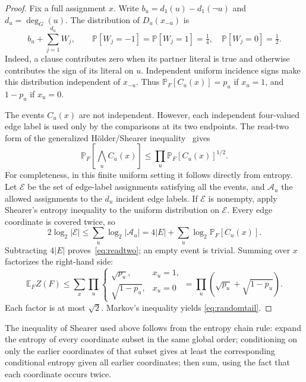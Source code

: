 \documentclass[11pt,a4paper]{article}
\theoremstyle{remark}
\newcommand{\E}{\mathbb E}
\newcommand{\Prb}{\mathbb P}
\begin{document}
\begin{proof}
Fix a full assignment $x$. Write $b_u=d_1(u)-d_1(\neg u)$ and
$d_u=\deg_G(u)$. The distribution of $D_u(x_{-u})$ is
\begin{equation}
 b_u+\sum_{j=1}^{d_u}W_j,\qquad
 \Prb[W_j=-1]=\Prb[W_j=1]=\tfrac14,\quad
 \Prb[W_j=0]=\tfrac12.                          \label{eq:lazy}
\end{equation}
Indeed, a clause contributes zero when its partner literal is true and
otherwise contributes the sign of its literal on $u$. Independent uniform
incidence signs make this distribution independent of $x_{-u}$.
Thus $\Prb_F[C_u(x)]=p_u$ if $x_u=1$, and $1-p_u$ if $x_u=0$.

The events $C_u(x)$ are not independent. However, each independent
four-valued edge label is used only by the comparisons at its two
endpoints. The read-two form of the generalized H\"older/Shearer
inequality~\cite{Finner,ReadK} gives
\begin{equation}
 \Prb_F\left[\bigwedge_u C_u(x)\right]
 \le \prod_u\Prb_F[C_u(x)]^{1/2}.              \label{eq:readtwo}
\end{equation}
For completeness, in this finite uniform setting it follows directly
from entropy. Let $\mathcal E$ be the set of edge-label assignments
satisfying all the events, and $\mathcal A_u$ the allowed assignments
to the $d_u$ incident edge labels. If $\mathcal E$ is nonempty, apply
Shearer's entropy inequality to the uniform distribution on $\mathcal E$.
Every edge coordinate is covered twice, so
\[
 2\log_2|\mathcal E|
 \le\sum_u\log_2|\mathcal A_u|
 =4|E|+\sum_u\log_2\Prb_F[C_u(x)].
\]
Subtracting $4|E|$ proves~\eqref{eq:readtwo}; an empty event is trivial.
Summing over $x$ factorizes the right-hand side:
\[
 \E_F Z(F)
 \le\sum_x\prod_u
 \begin{cases}\sqrt{p_u},&x_u=1,\\\sqrt{1-p_u},&x_u=0\end{cases}
 =\prod_u(\sqrt{p_u}+\sqrt{1-p_u}).
\]
Each factor is at most $\sqrt2$. Markov's inequality yields
\eqref{eq:randomtail}.
\end{proof}

The inequality of Shearer used above follows from the entropy chain rule:
expand the entropy of every coordinate subset in the same global order;
conditioning on only the earlier coordinates of that subset gives at
least the corresponding conditional entropy given all earlier coordinates;
then sum, using the fact that each coordinate occurs twice.
\end{document}
